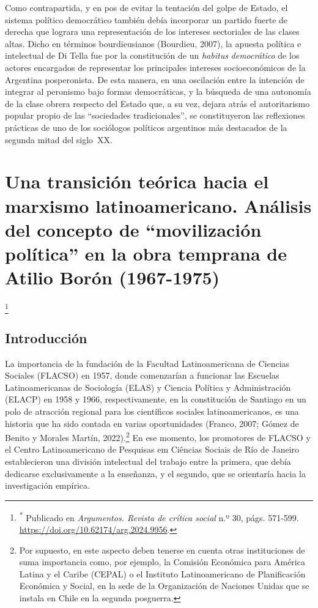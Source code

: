 Como contrapartida, y en pos de evitar la tentación del golpe de Estado, el sistema político democrático también debía incorporar un partido fuerte de derecha que lograra una representación de los intereses sectoriales de las clases altas. Dicho en términos bourdieusianos (Bourdieu, 2007), la apuesta política e intelectual de Di Tella fue por la constitución de un \emph{habitus} \emph{democrático} de los actores encargados de representar los principales intereses socioeconómicos de la Argentina posperonista. De esta manera, en una oscilación entre la intención de integrar al peronismo bajo formas democráticas, y la búsqueda de una autonomía de la clase obrera respecto del Estado que, a su vez, dejara atrás el autoritarismo popular propio de las \enquote{sociedades tradicionales}, se constituyeron las reflexiones prácticas de uno de los sociólogos políticos argentinos más destacados de la segunda mitad del siglo~XX.

\chapter{Una transición teórica hacia el marxismo latinoamericano. Análisis del concepto de \enquote{movilización política} en la obra temprana de Atilio Borón (1967-1975)}

\footnote{\textsuperscript{*} Publicado en \emph{Argumentos. Revista de crítica social} n.º 30, págs. 571-599. \url{https://doi.org/10.62174/arg.2024.9956}.}

\section{Introducción}

La importancia de la fundación de la Facultad Latinoamericana de Ciencias Sociales (FLACSO) en 1957, donde comenzarían a funcionar las Escuelas Latinoamericanas de Sociología (ELAS) y Ciencia Política y Administración (ELACP) en 1958 y 1966, respectivamente, en la constitución de Santiago en un polo de atracción regional para los científicos sociales latinoamericanos, es una historia que ha sido contada en varias oportunidades \parencite{1523-BEIGEL2009,1538-PEREZBRIGNOLI2008}(Franco, 2007; Gómez de Benito y Morales Martín, 2022).\footnote{Por supuesto, en este aspecto deben tenerse en cuenta otras instituciones de suma importancia como, por ejemplo, la Comisión Económica para América Latina y el Caribe (CEPAL) o el Instituto Latinoamericano de Planificación Económica y Social, en la sede de la Organización de Naciones Unidas que se instala en Chile en la segunda posguerra.} En ese momento, los promotores de FLACSO y el Centro Latinoamericano de Pesquisas em Ciências Sociais de Río de Janeiro establecieron una división intelectual del trabajo entre la primera, que debía dedicarse exclusivamente a la enseñanza, y el segundo, que se orientaría hacia la investigación empírica.

